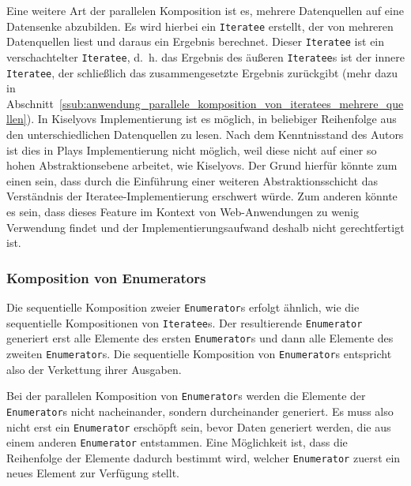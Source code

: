 Eine weitere Art der parallelen Komposition ist es, mehrere Datenquellen auf eine Datensenke abzubilden.
Es wird hierbei ein \lstinline|Iteratee| erstellt, der von mehreren Datenquellen liest und daraus ein Ergebnis berechnet.
Dieser \lstinline|Iteratee| ist ein verschachtelter \lstinline|Iteratee|, d.~h. das Ergebnis des äußeren \lstinline|Iteratee|s ist der innere \lstinline|Iteratee|, der schließlich das zusammengesetzte Ergebnis zurückgibt (mehr dazu in Abschnitt~\ref{ssub:anwendung_parallele_komposition_von_iteratees_mehrere_quellen}).
In Kiselyovs Implementierung ist es möglich, in beliebiger Reihenfolge aus den unterschiedlichen Datenquellen zu lesen.
Nach dem Kenntnisstand des Autors ist dies in Plays Implementierung nicht möglich, weil diese nicht auf einer so hohen Abstraktionsebene arbeitet, wie Kiselyovs.
Der Grund hierfür könnte zum einen sein, dass durch die Einführung einer weiteren Abstraktionsschicht das Verständnis der Iteratee-Implementierung erschwert würde.
Zum anderen könnte es sein, dass dieses Feature im Kontext von Web-Anwendungen zu wenig Verwendung findet und der Implementierungsaufwand deshalb nicht gerechtfertigt ist.


\subsubsection{Komposition von Enumerators} %
\label{ssub:komposition_von_enumerators}

Die sequentielle Komposition zweier \lstinline|Enumerator|s erfolgt ähnlich, wie die sequentielle Kompositionen von \lstinline|Iteratee|s.
Der resultierende \lstinline|Enumerator| generiert erst alle Elemente des ersten \lstinline|Enumerator|s und dann alle Elemente des zweiten \lstinline|Enumerator|s.
Die sequentielle Komposition von \lstinline|Enumerator|s entspricht also der Verkettung ihrer Ausgaben. %

Bei der parallelen Komposition von \lstinline|Enumerator|s werden die Elemente der \lstinline|Enumerator|s nicht nacheinander, sondern durcheinander generiert.
Es muss also nicht erst ein \lstinline|Enumerator| erschöpft sein, bevor Daten generiert werden, die aus einem anderen \lstinline|Enumerator| entstammen.
Eine Möglichkeit ist, dass die Reihenfolge der Elemente dadurch bestimmt wird, welcher \lstinline|Enumerator| zuerst ein neues Element zur Verfügung stellt. %


